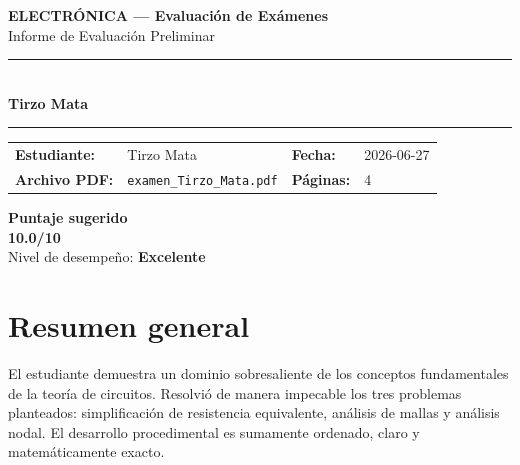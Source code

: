 \documentclass[11pt,a4paper]{article}
\begin{document}
\begin{center}
  {\Large\bfseries\color{azulTitulo} ELECTRÓNICA --- Evaluación de Exámenes}\\[4pt]
  {\large Informe de Evaluación Preliminar}\\[12pt]
  \rule{\linewidth}{1.2pt}\\[6pt]
  {\LARGE\bfseries Tirzo Mata}\\[4pt]
  \rule{\linewidth}{0.6pt}
\end{center}

\vspace{4pt}
\begin{tcolorbox}[cajaTitulo, title=Datos del informe]
\begin{tabular}{@{}llll@{}}
  \textbf{Estudiante:}  & Tirzo Mata  &
  \textbf{Fecha:}       & 2026-06-27 \\[4pt]
  \textbf{Archivo PDF:} & \texttt{examen\_Tirzo\_Mata.pdf}  &
  \textbf{Páginas:}     & 4 \\
\end{tabular}
\end{tcolorbox}

\vspace{6pt}
\begin{center}
  \begin{tcolorbox}[
    enhanced,
    colback=white, colframe=desempeno_excelente,
    width=0.62\linewidth,
    boxrule=2pt,
    halign=center, valign=center,
    top=8pt, bottom=8pt,
  ]
    \centering
    {\large\bfseries Puntaje sugerido}\\[6pt]
    {\Huge\bfseries\color{desempeno_excelente} 10.0/10}\\[6pt]
    {\large Nivel de desempeño: \textbf{\color{desempeno_excelente} Excelente}}
  \end{tcolorbox}
\end{center}

\section*{Resumen general}
El estudiante demuestra un dominio sobresaliente de los conceptos fundamentales de la teoría de circuitos. Resolvió de manera impecable los tres problemas planteados: simplificación de resistencia equivalente, análisis de mallas y análisis nodal. El desarrollo procedimental es sumamente ordenado, claro y matemáticamente exacto.
\end{document}
